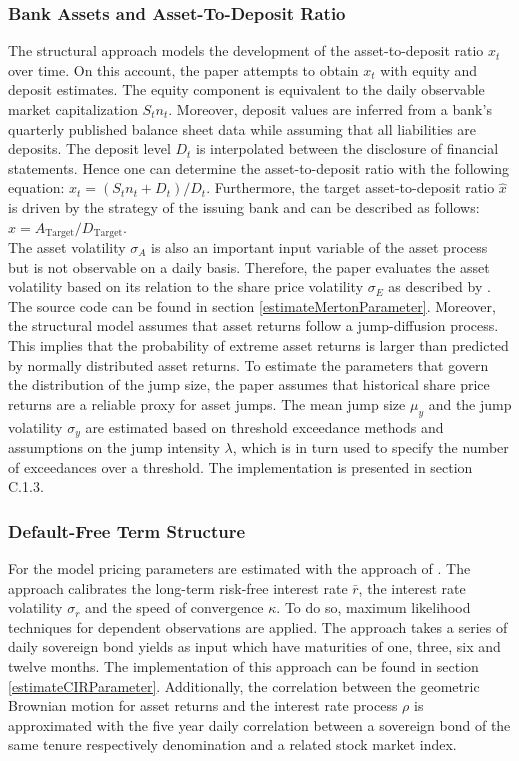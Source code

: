 \subsubsection*{Bank Assets and Asset-To-Deposit Ratio}
The structural approach models the development of the asset-to-deposit ratio $x_t$ over time. On this account, the paper attempts to obtain $x_t$ with equity and deposit estimates. The equity component is equivalent to the daily observable market capitalization $S_t n_t$. Moreover, deposit values are inferred from a bank's quarterly published balance sheet data while assuming that all liabilities are deposits. The deposit level $D_t$ is interpolated between the disclosure of financial statements. \citep{wilkens2014contingent} Hence one can determine the asset-to-deposit ratio with the following equation: $x_t = (S_t n_t + D_t)/D_t$. Furthermore, the target asset-to-deposit ratio $\hat{x}$ is driven by the strategy of the issuing bank and can be described as follows: $\hat{x} = A_\text{Target}/D_\text{Target}$.\\

The asset volatility $\sigma_A$ is also an important input variable of the asset process but is not observable on a daily basis. Therefore, the paper evaluates the asset volatility based on its relation to the share price volatility $\sigma_E$ as described by \citet{merton1974pricing}. The source code can be found in section \ref{estimateMertonParameter}. Moreover, the structural model assumes that asset returns follow a jump-diffusion process. This implies that the probability of extreme asset returns is larger than predicted by normally distributed asset returns. To estimate the parameters that govern the distribution of the jump size, the paper assumes that historical share price returns are a reliable proxy for asset jumps. The mean jump size $\mu_y$ and the jump volatility $\sigma_y$ are estimated based on threshold exceedance methods and assumptions on the jump intensity $\lambda$, which is in turn used to specify the number of exceedances over a threshold. \citep{longin2001extreme} The implementation is presented in section C.1.3.

\subsubsection*{Default-Free Term Structure}
For the \citet{cox1985theory} model pricing parameters are estimated with the approach of \citet{remillard2013statistical}. The approach calibrates the long-term risk-free interest rate $\bar{r}$, the interest rate volatility $\sigma_r$ and the speed of convergence $\kappa$. To do so, maximum likelihood techniques for dependent observations are applied. The approach takes a series of daily sovereign bond yields as input which have maturities of one, three, six and twelve months. The implementation of this approach can be found in section \ref{estimateCIRParameter}. Additionally, the correlation between the geometric Brownian motion for asset returns and the interest rate process $\rho$ is approximated with the five year daily correlation between a sovereign bond of the same tenure respectively denomination and a related stock market index.

